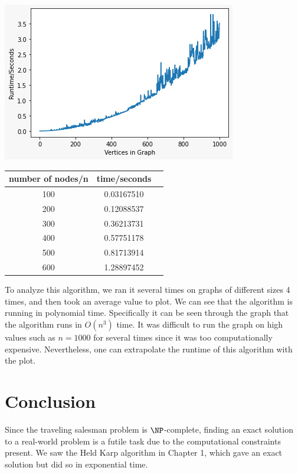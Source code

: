 \documentclass[12pt]{report}
\begin{document}
\begin{center}
    \includegraphics[scale = 0.75]{images/christ100.jpeg}
\end{center}
\begin{center}
\begin{tabular}{ |c|c|c| } 
 \hline
 number of nodes/n & time/seconds \\ 
 \hline
 100 & 0.03167510 \\ 
 \hline
 200 & 0.12088537 \\ 
 \hline
 300 & 0.36213731 \\ 
 \hline
 400 & 0.57751178  \\ 
 \hline
 500 & 0.81713914 \\ 
 \hline
 600 & 1.28897452 \\ 
 \hline
\end{tabular}
\end{center}
\vspace{3mm}
To analyze this algorithm, we ran it several times on graphs of different sizes 4 times, and then took an average value to plot. We can see that the algorithm is running in polynomial time. Specifically it can be seen through the graph that the algorithm runs in $O(n^3)$ time. It was difficult to run the graph on high values such as $n=1000$ for several times since it was too computationally expensive. Nevertheless, one can extrapolate the runtime of this algorithm with the plot.  
\chapter{Conclusion}

Since the traveling salesman problem is $\NP$-complete, finding an exact solution to a real-world problem is a futile task due to the computational constraints present. We saw the Held Karp algorithm in Chapter 1, which gave an exact solution but did so in exponential time. \\
\end{document}
